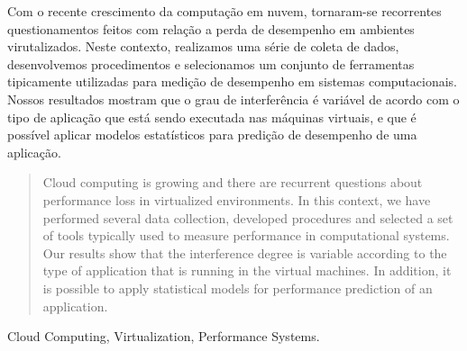 \begin{resumo}
Com o recente crescimento da computação em nuvem, tornaram-se recorrentes
questionamentos feitos com relação a perda de desempenho em ambientes
virutalizados. Neste contexto, realizamos uma série de coleta de dados,
desenvolvemos procedimentos e selecionamos um conjunto de ferramentas
tipicamente utilizadas para medição de desempenho em sistemas computacionais.
Nossos resultados mostram que o grau de interferência é variável de acordo com
o tipo de aplicação que está sendo executada nas máquinas virtuais, e que é
possível aplicar modelos estatísticos para predição de desempenho de uma
aplicação.
\end{resumo}

\begin{abstract}
Cloud computing is growing and there are recurrent questions about performance
loss in virtualized environments. In this context, we have performed several
data collection, developed procedures and selected a set of tools typically
used to measure performance in computational systems. Our results show that the
interference degree is variable according to the type of application that is
running in the virtual machines. In addition, it is possible to apply
statistical models for performance prediction of an application.
\end{abstract}

\begin{IEEEkeywords}
Cloud Computing, Virtualization, Performance Systems.
\end{IEEEkeywords}
